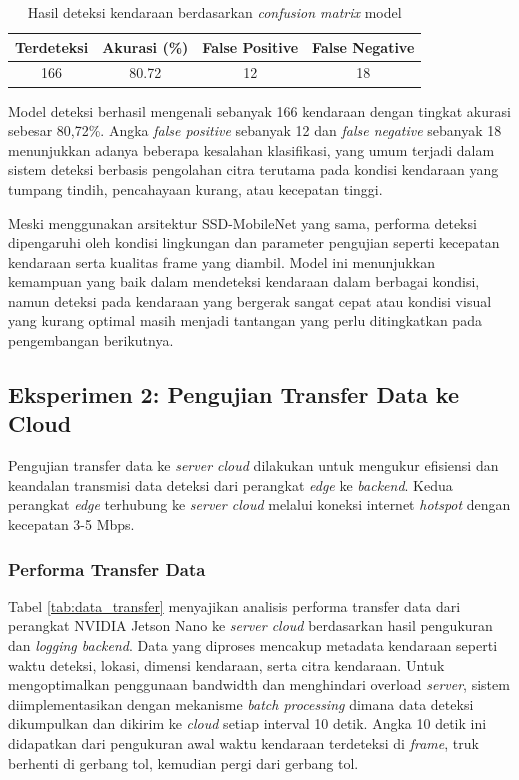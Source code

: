 \begin{table}[htbp]
  \centering
  \caption{Hasil deteksi kendaraan berdasarkan \emph{confusion matrix} model}
  \label{tab:detection_results_model}
  \begin{tabular}{|c|c|c|c|}
  \hline
  \rowcolor[HTML]{C0C0C0}
  \textbf{Terdeteksi} & \textbf{Akurasi (\%)} & \textbf{False Positive} & \textbf{False Negative} \\
  \hline
  166 & 80.72 & 12 & 18 \\
  \hline
  \end{tabular}
\end{table}

Model deteksi berhasil mengenali sebanyak 166 kendaraan dengan tingkat akurasi sebesar 80,72\%. Angka \emph{false positive} sebanyak 12 dan \emph{false negative} sebanyak 18 menunjukkan adanya beberapa kesalahan klasifikasi, yang umum terjadi dalam sistem deteksi berbasis pengolahan citra terutama pada kondisi kendaraan yang tumpang tindih, pencahayaan kurang, atau kecepatan tinggi.

Meski menggunakan arsitektur SSD-MobileNet yang sama, performa deteksi dipengaruhi oleh kondisi lingkungan dan parameter pengujian seperti kecepatan kendaraan serta kualitas frame yang diambil. Model ini menunjukkan kemampuan yang baik dalam mendeteksi kendaraan dalam berbagai kondisi, namun deteksi pada kendaraan yang bergerak sangat cepat atau kondisi visual yang kurang optimal masih menjadi tantangan yang perlu ditingkatkan pada pengembangan berikutnya.

\subsection{Eksperimen 2: Pengujian Transfer Data ke Cloud}
\label{sec:eksperimen2}

Pengujian transfer data ke \emph{server cloud} dilakukan untuk mengukur efisiensi dan keandalan transmisi data deteksi dari perangkat \emph{edge} ke \emph{backend}. Kedua perangkat \emph{edge} terhubung ke \emph{server cloud} melalui koneksi internet \emph{hotspot} dengan kecepatan 3-5 Mbps.

\subsubsection{Performa Transfer Data}

Tabel \ref{tab:data_transfer} menyajikan analisis performa transfer data dari perangkat NVIDIA Jetson Nano ke \emph{server cloud} berdasarkan hasil pengukuran dan \emph{logging backend}. Data yang diproses mencakup metadata kendaraan seperti waktu deteksi, lokasi, dimensi kendaraan, serta citra kendaraan. Untuk mengoptimalkan penggunaan bandwidth dan menghindari overload \emph{server}, sistem diimplementasikan dengan mekanisme \emph{batch processing} dimana data deteksi dikumpulkan dan dikirim ke \emph{cloud} setiap interval 10 detik. Angka 10 detik ini didapatkan dari pengukuran awal waktu kendaraan terdeteksi di \emph{frame}, truk berhenti di gerbang tol, kemudian pergi dari gerbang tol.

